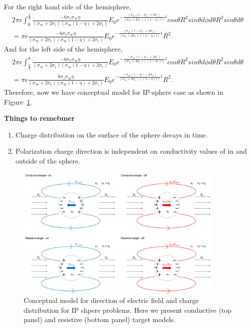 \documentclass[a4paper, 11pt]{article}
\begin{document}
For the right hand side of the hemisphere, 
\begin{align*}
	2\pi\epsilon \int_{0}^{\frac{\pi}{2}} \frac{-6\sigma_1\sigma_{\infty}\eta}{(\sigma_{\infty}+2\sigma_1)(\sigma_{\infty}(1-\eta)+2\sigma_1)}E_0e^{-\frac{(\sigma_{\infty}(1-\eta)+2\sigma_1)}{(\sigma_{\infty} + 2\sigma_1)((1-\eta)\tau)}t}cos\theta R^2 sin\theta d\phi d\theta R^2 sin\theta d\theta  \\
	= \pi\epsilon\frac{-6\sigma_1\sigma_{\infty}\eta}{(\sigma_{\infty}+2\sigma_1)(\sigma_{\infty}(1-\eta)+2\sigma_1)}
	                  E_0e^{-\frac{(\sigma_{\infty}(1-\eta)+2\sigma_1)}{(\sigma_{\infty} + 2\sigma_1)((1-\eta)\tau)}t}R^2.
\end{align*}
And for the left side of the hemisphere,
\begin{align*}
	2\pi\epsilon \int_{\frac{\pi}{2}}^{\pi} \frac{-6\sigma_1\sigma_{\infty}\eta}{(\sigma_{\infty}+2\sigma_1)(\sigma_{\infty}(1-\eta)+2\sigma_1)}E_0e^{-\frac{(\sigma_{\infty}(1-\eta)+2\sigma_1)}{(\sigma_{\infty} + 2\sigma_1)((1-\eta)\tau)}t}cos\theta R^2 sin\theta d\phi d\theta R^2 sin\theta d\theta  \\
	= \pi\epsilon\frac{6\sigma_1\sigma_{\infty}\eta}{(\sigma_{\infty}+2\sigma_1)(\sigma_{\infty}(1-\eta)+2\sigma_1)}
	                  E_0e^{-\frac{(\sigma_{\infty}(1-\eta)+2\sigma_1)}{(\sigma_{\infty} + 2\sigma_1)((1-\eta)\tau)}t}R^2.
\end{align*}
Therefore, now we have conceptual model for IP-sphere case as shown in Figure~\ref{F:IPconcept}. 

\textbf{Things to remebmer}
\begin{enumerate}
	\item Charge distribution on the surface of the sphere decays in time.
	\item Polarization charge direction is independent on conductivity values of in and outside of the sphere.
\end{enumerate}
\begin{figure}[htb]
	\centering
	\includegraphics[width=0.9\textwidth]{ConceptModel.png}
	\caption{Conceptual model for direction of electric field and charge distribution for IP shpere problems. Here we present conductive (top panel) and resistive (bottom panel) target models.}
	\label{F:IPconcept}
\end{figure}
\clearpage
\end{document}

